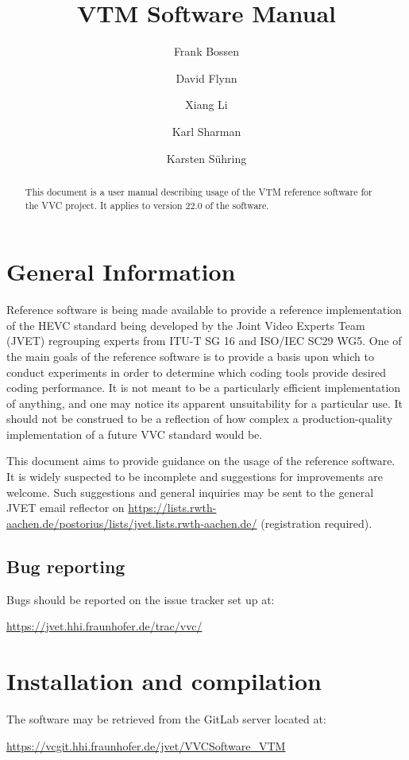 \documentclass[a4paper,11pt]{jvetdoc}
\title{VTM Software Manual}
\author{%
	Frank Bossen
	\email{frank@bossentech.com}
	\and
	David Flynn
	\and
	Xiang Li
	\email{xlxiangli@google.com}
	\and
	Karl Sharman
	\email{karl.sharman@eu.sony.com}
	\and
	Karsten S\"uhring
	\email{karsten.suehring@hhi.fraunhofer.de}
}
\begin{document}
\maketitle
\begin{abstract}
This document is a user manual describing usage of the VTM reference software
for the VVC project. It applies to version 22.0 of the software.
\end{abstract}

\tableofcontents
\listoftables


\section{General Information}
Reference software is being made available to provide a reference
implementation of the HEVC standard being developed by the Joint 
Video Experts Team (JVET) regrouping experts from
ITU-T SG 16 and ISO/IEC SC29 WG5. One of the main goals of the
reference software is to provide a basis upon which to conduct
experiments in order to determine which coding tools provide desired
coding performance. It is not meant to be a particularly efficient
implementation of anything, and one may notice its apparent
unsuitability for a particular use. It should not be construed to be a
reflection of how complex a production-quality implementation of a
future VVC standard would be.

This document aims to provide guidance on the usage of the reference
software. It is widely suspected to be incomplete and suggestions for
improvements are welcome. Such suggestions and general inquiries may be
sent to the general JVET email reflector on
\url{https://lists.rwth-aachen.de/postorius/lists/jvet.lists.rwth-aachen.de/} 
(registration required).

\subsection*{Bug reporting}
Bugs should be reported on the issue tracker set up at:

\url{https://jvet.hhi.fraunhofer.de/trac/vvc/}

\section{Installation and compilation}
The software may be retrieved from the GitLab server located at:

\url{https://vcgit.hhi.fraunhofer.de/jvet/VVCSoftware_VTM}
\end{document}
